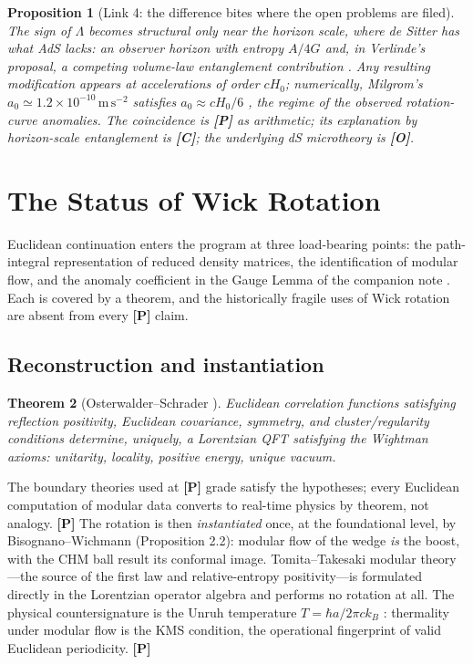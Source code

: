 \documentclass[11pt]{article}
\newtheorem{theorem}{Theorem}[section]
\newtheorem{proposition}[theorem]{Proposition}
\theoremstyle{definition}
\newcommand{\pP}{\textbf{[P]}}
\newcommand{\pC}{\textbf{[C]}}
\newcommand{\pO}{\textbf{[O]}}
\begin{document}
\begin{proposition}[Link 4: the difference bites where the open problems
are filed]
The sign of $\Lambda$ becomes structural only near the horizon scale,
where de Sitter has what AdS lacks: an observer horizon with entropy
$A/4G$ \cite{GibbonsHawking1977} and, in Verlinde's proposal, a competing
volume-law entanglement contribution \cite{Verlinde2017}. Any resulting
modification appears at accelerations of order $cH_0$; numerically,
Milgrom's $a_0\simeq1.2\times10^{-10}\,\mathrm{m\,s^{-2}}$ satisfies
$a_0\approx cH_0/6$ \cite{Milgrom1983}, the regime of the observed
rotation-curve anomalies. The coincidence is \pP{} as arithmetic; its
explanation by horizon-scale entanglement is \pC{}; the underlying dS
microtheory is \pO{}.
\end{proposition}

\section{The Status of Wick Rotation}
\label{app:wick}

Euclidean continuation enters the program at three load-bearing points:
the path-integral representation of reduced density matrices, the
identification of modular flow, and the anomaly coefficient in the Gauge
Lemma of the companion note \cite{McGwier2026b}. Each is covered by a
theorem, and the historically fragile uses of Wick rotation are absent
from every \pP{} claim.

\subsection{Reconstruction and instantiation}

\begin{theorem}[Osterwalder--Schrader \cite{OS1973,OS1975}]
Euclidean correlation functions satisfying reflection positivity,
Euclidean covariance, symmetry, and cluster/regularity conditions
determine, uniquely, a Lorentzian QFT satisfying the Wightman axioms:
unitarity, locality, positive energy, unique vacuum.
\end{theorem}

The boundary theories used at \pP{} grade satisfy the hypotheses; every
Euclidean computation of modular data converts to real-time physics by
theorem, not analogy. \pP{} The rotation is then \emph{instantiated} once,
at the foundational level, by Bisognano--Wichmann
\cite{BisognanoWichmann1976} (Proposition 2.2): modular flow of the wedge
\emph{is} the boost, with the CHM ball result its conformal image.
Tomita--Takesaki modular theory---the source of the first law and
relative-entropy positivity---is formulated directly in the Lorentzian
operator algebra \cite{Haag1996} and performs no rotation at all. The
physical countersignature is the Unruh temperature $T=\hbar a/2\pi ck_B$
\cite{Unruh1976}: thermality under modular flow is the KMS condition, the
operational fingerprint of valid Euclidean periodicity. \pP{}
\end{document}
